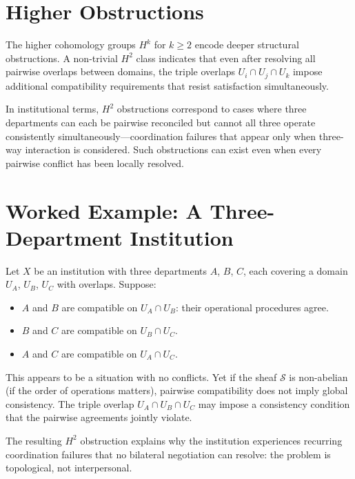 \section{Higher Obstructions}

\claimC The higher cohomology groups $H^k$ for $k \geq 2$ encode deeper
structural obstructions. A non-trivial $H^2$ class indicates that even after
resolving all pairwise overlaps between domains, the triple overlaps
$U_i \cap U_j \cap U_k$ impose additional compatibility requirements that
resist satisfaction simultaneously.

In institutional terms, $H^2$ obstructions correspond to cases where three
departments can each be pairwise reconciled but cannot all three operate
consistently simultaneously---coordination failures that appear only when
three-way interaction is considered. Such obstructions can exist even when
every pairwise conflict has been locally resolved.

\section{Worked Example: A Three-Department Institution}

\claimP Let $X$ be an institution with three departments $A$, $B$, $C$, each
covering a domain $U_A$, $U_B$, $U_C$ with overlaps. Suppose:
\begin{itemize}
  \item $A$ and $B$ are compatible on $U_A \cap U_B$: their operational
    procedures agree.
  \item $B$ and $C$ are compatible on $U_B \cap U_C$.
  \item $A$ and $C$ are compatible on $U_A \cap U_C$.
\end{itemize}
This appears to be a situation with no conflicts. Yet if the sheaf $\mathcal{S}$
is non-abelian (if the order of operations matters), pairwise compatibility does
not imply global consistency. The triple overlap $U_A \cap U_B \cap U_C$ may
impose a consistency condition that the pairwise agreements jointly violate.

The resulting $H^2$ obstruction explains why the institution experiences
recurring coordination failures that no bilateral negotiation can resolve:
the problem is topological, not interpersonal.
